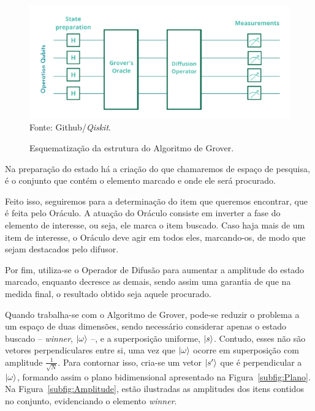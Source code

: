 \begin{figure}[ht!]
    \centering
    \caption{Esquematizaç\~{a}o da estrutura do Algoritmo de Grover.}
    \includegraphics[width=.7\textwidth]{Imagens/esquemaG.png}\\
    {\small Fonte: Github/\emph{Qiskit}.}
    \label{fig:groverEsquema}
\end{figure}

Na preparaç\~{a}o do estado h\'{a} a criaç\~{a}o do que chamaremos de espaço de pesquisa, \'{e} o conjunto que cont\'{e}m o elemento marcado e onde ele ser\'{a} procurado. 

Feito isso, seguiremos para a determinaç\~{a}o do item que queremos encontrar, que \'{e} feita pelo Or\'{a}culo. A atuaç\~{a}o do Or\'{a}culo consiste em inverter a fase do elemento de interesse, ou seja, ele marca o item buscado. Caso haja mais de um item de interesse, o Or\'{a}culo deve agir em todos eles, marcando-os, de modo que sejam destacados pelo difusor.

Por fim, utiliza-se o Operador de Difus\~{a}o para aumentar a amplitude do estado marcado, enquanto decresce as demais, sendo assim uma garantia de que na medida final, o resultado obtido seja aquele procurado.

Quando trabalha-se com o Algoritmo de Grover, pode-se reduzir o problema a um espaço de duas dimensões, sendo necess\'{a}rio considerar apenas o estado buscado -- \textit{winner}, $\ket{\omega}$ --, e a superposiç\~{a}o uniforme, $\ket{s}$. Contudo, esses n\~{a}o s\~{a}o vetores perpendiculares entre si, uma vez que $\ket{\omega}$ ocorre em superposiç\~{a}o com amplitude $\frac{1}{\sqrt{N}}$. Para contornar isso, cria-se um vetor $\ket{s'}$ que \'{e} perpendicular a $\ket{\omega}$, formando assim o plano bidimensional apresentado na Figura~\ref{subfig:Plano}. Na Figura~\ref{subfig:Amplitude}, est\~{a}o ilustradas as amplitudes dos itens contidos no conjunto, evidenciando o elemento \textit{winner}.

